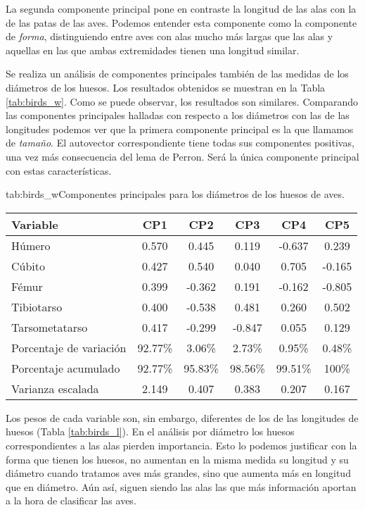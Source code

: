 \documentclass[tfg,cienciasbased,lot,lof,covers,final,overleaf,nocopyright]{tfgtfmthesisuam}
\begin{document}
La segunda componente principal pone en contraste la longitud de las alas con la de las patas de las aves. Podemos entender esta componente como la componente de \textit{forma}, distinguiendo entre aves con alas mucho más largas que las alas y aquellas en las que ambas extremidades tienen una longitud similar.

Se realiza un análisis de componentes principales también de las medidas de los diámetros de los huesos. Los resultados obtenidos se muestran en la Tabla \ref{tab:birds_w}. Como se puede observar, los resultados son similares. Comparando las componentes principales halladas con respecto a los diámetros con las de las longitudes podemos ver que la primera componente principal es la que llamamos de \textit{tamaño}. El autovector correspondiente tiene todas sus componentes positivas, una vez más consecuencia del lema de Perron. Será la única componente principal con estas características.

\begin{table}{tab:birds_w}{Componentes principales para los diámetros de los huesos de aves.}
    \begin{tabular}{lccccc}
        \toprule \textbf{Variable} & \textbf{CP1} & \textbf{CP2} & \textbf{CP3} & \textbf{CP4} & \textbf{CP5}\\
        \midrule
        Húmero &  0.570 &  0.445 &  0.119 & -0.637 &  0.239\\
        Cúbito & 0.427 &  0.540 &  0.040 &  0.705 & -0.165\\
        Fémur &  0.399 & -0.362 &  0.191 & -0.162 & -0.805\\
        Tibiotarso & 0.400 & -0.538 &  0.481 &  0.260 &  0.502\\
        Tarsometatarso &  0.417 & -0.299 & -0.847 &  0.055 &  0.129\\
        \midrule Porcentaje de variación & 92.77\% & 3.06\% & 2.73\% & 0.95\% & 0.48\%\\
        Porcentaje acumulado & 92.77\% & 95.83\% & 98.56\% & 99.51\% & 100\%\\
        Varianza escalada & 2.149 & 0.407 & 0.383 & 0.207 & 0.167\\
        \bottomrule
    \end{tabular}
\end{table}

Los pesos de cada variable son, sin embargo, diferentes de los de las longitudes de huesos (Tabla \ref{tab:birds_l}). En el análisis por diámetro los huesos correspondientes a las alas pierden importancia. Esto lo podemos justificar con la forma que tienen los huesos, no aumentan en la misma medida su longitud y su diámetro cuando tratamos aves más grandes, sino que aumenta más en longitud que en diámetro. Aún así, siguen siendo las alas las que más información aportan a la hora de clasificar las aves. 
\end{document}
